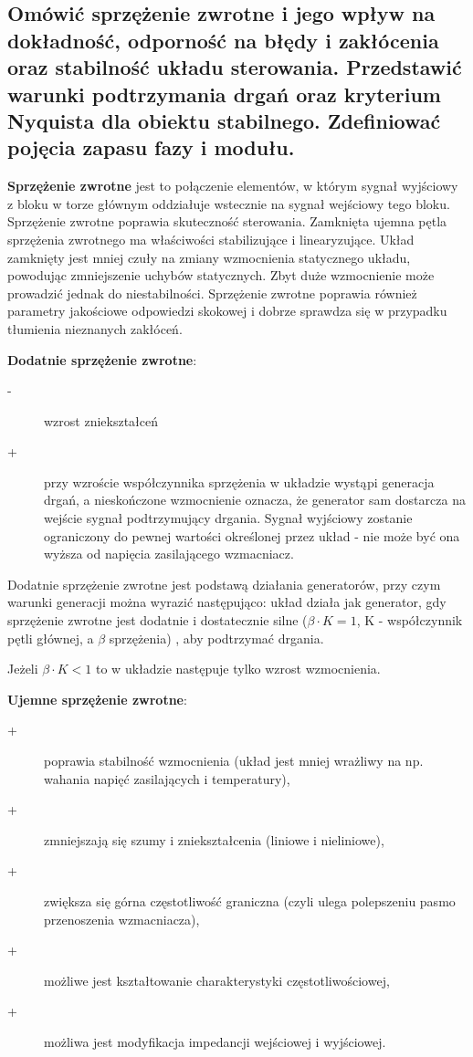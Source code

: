\subsection{Omówić sprzężenie zwrotne i jego wpływ na dokładność, odporność na błędy i zakłócenia oraz stabilność układu sterowania. Przedstawić warunki podtrzymania drgań oraz kryterium Nyquista dla obiektu stabilnego. Zdefiniować pojęcia zapasu fazy i modułu.}

\textbf{Sprzężenie zwrotne} jest to połączenie elementów, w którym sygnał wyjściowy z bloku w torze głównym oddziałuje wstecznie na sygnał wejściowy tego bloku. Sprzężenie zwrotne poprawia skuteczność sterowania. Zamknięta ujemna pętla sprzężenia zwrotnego ma właściwości stabilizujące i linearyzujące. Układ zamknięty jest mniej czuły na zmiany wzmocnienia statycznego układu, powodując zmniejszenie uchybów statycznych. Zbyt duże wzmocnienie może prowadzić jednak do niestabilności. Sprzężenie zwrotne poprawia również parametry jakościowe odpowiedzi skokowej i dobrze sprawdza się w przypadku tłumienia nieznanych zakłóceń.

\textbf{Dodatnie sprzężenie zwrotne}:
\begin{description}
    \item[-] wzrost zniekształceń
    \item[+] przy wzroście współczynnika sprzężenia w układzie wystąpi generacja drgań, a nieskończone wzmocnienie oznacza, że generator sam dostarcza na wejście sygnał podtrzymujący drgania. Sygnał wyjściowy zostanie ograniczony do pewnej wartości określonej przez układ - nie może być ona wyższa od napięcia zasilającego wzmacniacz.
\end{description}

Dodatnie sprzężenie zwrotne jest podstawą działania generatorów, przy czym warunki generacji można wyrazić następująco: układ działa jak generator, gdy sprzężenie zwrotne jest dodatnie i dostatecznie silne ($\beta\cdot{}K=1$, K - współczynnik pętli głównej, a $\beta$ sprzężenia) , aby podtrzymać drgania.

Jeżeli $\beta\cdot{}K<1$ to w układzie następuje tylko wzrost wzmocnienia.

\textbf{Ujemne sprzężenie zwrotne}:
\begin{description}
    \item[+] poprawia stabilność wzmocnienia (układ jest mniej wrażliwy na np. wahania napięć zasilających i temperatury),
    \item[+] zmniejszają się szumy i zniekształcenia (liniowe i nieliniowe),
    \item[+] zwiększa się górna częstotliwość graniczna (czyli ulega polepszeniu pasmo przenoszenia wzmacniacza),
    \item[+] możliwe jest kształtowanie charakterystyki częstotliwościowej,
    \item[+] możliwa jest modyfikacja impedancji wejściowej i wyjściowej.
\end{description}

